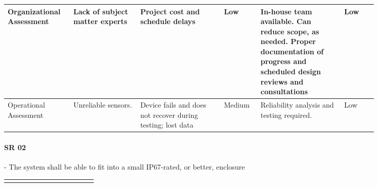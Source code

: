 \begin{landscape}
{\begin{longtable}{| p{0.12\linewidth} | p{0.16\linewidth} |  p{0.20\linewidth} | p{0.08\linewidth} | p{0.20\linewidth} | p{0.08\linewidth} |}
	\hline
	Organizational \newline Assessment & Lack of subject matter experts & Project cost and schedule delays & \cellcolor{green} Low & In-house team available. \newline Can reduce scope, as needed. \newline Proper documentation of progress and scheduled design reviews and consultations & \cellcolor{green} Low \\
	\hline
	Operational \newline Assessment & Unreliable sensors. & Device fails and does not recover during testing; lost data & \cellcolor{yellow} Medium & Reliability analysis and testing required. & \cellcolor{green} Low
	\label{tab:sr01_feasibility}
\end{longtable}
}
\newpage




\paragraph*{SR 02} - The system shall be able to fit into a small IP67-rated, or better, enclosure

{\fontsize{8pt}{8pt}\selectfont
\begin{longtable}{| p{0.12\linewidth} | p{0.16\linewidth} |  p{0.20\linewidth} | p{0.08\linewidth} | p{0.20\linewidth} | p{0.08\linewidth} |}
	\hline \endlastfoot
	

\end{longtable}}
\end{landscape}
